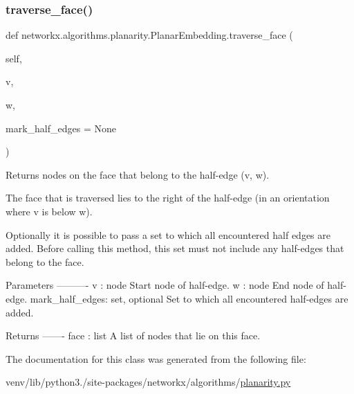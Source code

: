 \subsubsection{\texorpdfstring{traverse\+\_\+face()}{traverse\_face()}}
{\footnotesize\ttfamily def networkx.\+algorithms.\+planarity.\+Planar\+Embedding.\+traverse\+\_\+face (\begin{DoxyParamCaption}\item[{}]{self,  }\item[{}]{v,  }\item[{}]{w,  }\item[{}]{mark\+\_\+half\+\_\+edges = {\ttfamily None} }\end{DoxyParamCaption})}

\begin{DoxyVerb}Returns nodes on the face that belong to the half-edge (v, w).

The face that is traversed lies to the right of the half-edge (in an
orientation where v is below w).

Optionally it is possible to pass a set to which all encountered half
edges are added. Before calling this method, this set must not include
any half-edges that belong to the face.

Parameters
----------
v : node
    Start node of half-edge.
w : node
    End node of half-edge.
mark_half_edges: set, optional
    Set to which all encountered half-edges are added.

Returns
-------
face : list
    A list of nodes that lie on this face.
\end{DoxyVerb}
 

The documentation for this class was generated from the following file\+:\begin{DoxyCompactItemize}
\item 
venv/lib/python3./site-\/packages/networkx/algorithms/\hyperlink{planarity_8py}{planarity.\+py}\end{DoxyCompactItemize}
